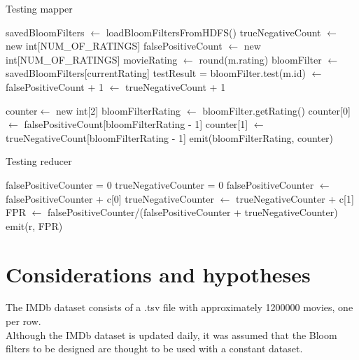 \begin{algorithm}[H]
	\caption{Testing mapper} 
	\begin{algorithmic}[1]
			\State savedBloomFilters $\gets$ loadBloomFiltersFromHDFS()
			\State trueNegativeCount $\gets$ new int[NUM\_OF\_RATINGS]
        	\State falsePositiveCount $\gets$ new int[NUM\_OF\_RATINGS]
				\State movieRating $\gets$ round(m.rating)
	        		\State bloomFilter $\gets$ savedBloomFilters[currentRating]
	        		\State testResult = bloomFilter.test(m.id)
	        		$\gets$ falsePositiveCount + 1
	        		\EndIf
	        		$\gets$ trueNegativeCount + 1
	        		\EndIf
	        	\EndFor
	        \EndFor
	        
	        \State counter$\gets$ new int[2]
	        	\State bloomFilterRating $\gets$ bloomFilter.getRating()
				\State counter[0] $\gets$ falsePositiveCount[bloomFilterRating - 1]
				\State counter[1] $\gets$ trueNegativeCount[bloomFilterRating - 1]
				\State emit(bloomFilterRating, counter)
	        \EndFor
		\EndProcedure
	\end{algorithmic} 
\end{algorithm}

\begin{algorithm}[H]
	\caption{Testing reducer} 
	\begin{algorithmic}[1]
		\State falsePositiveCounter = 0
		\State trueNegativeCounter = 0
				\State falsePositiveCounter $\gets$ falsePositiveCounter  + c[0]
				\State trueNegativeCounter $\gets$ trueNegativeCounter + c[1]
			\EndIf
		\EndFor
			\State FPR $\gets$ falsePositiveCounter/(falsePositiveCounter + trueNegativeCounter)
			\State emit(r, FPR)
		\EndIf
		\EndProcedure
	\end{algorithmic} 
\end{algorithm}

\section{Considerations and hypotheses}
The IMDb dataset consists of a .tsv file with approximately 1200000 movies, one per row.\\
Although the IMDb dataset is updated daily, it was assumed that the Bloom filters to be designed are thought to be used with a constant dataset. 